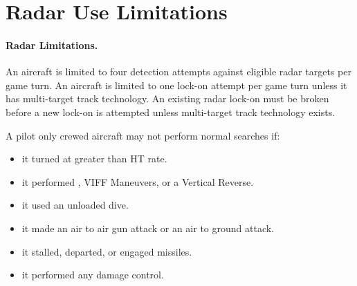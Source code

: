 
\section{Radar Use Limitations}

\paragraph{Radar Limitations.} An aircraft is limited to four detection attempts against eligible radar targets per game turn. An aircraft is limited to one lock-on attempt per game turn unless it has multi-target track technology. An existing radar lock-on must be broken before a new lock-on is attempted unless multi-target track technology exists.

A pilot only crewed aircraft may not perform normal searches if:

\begin{itemize}

    \item it turned at greater than HT rate.

    \item it performed , VIFF Maneuvers, or a Vertical Reverse.

    \item it used an unloaded dive.

    \item it made an air to air gun attack or an air to ground attack.

    \item it stalled, departed, or engaged missiles.


    \item it performed any damage control.

    
\end{itemize}

